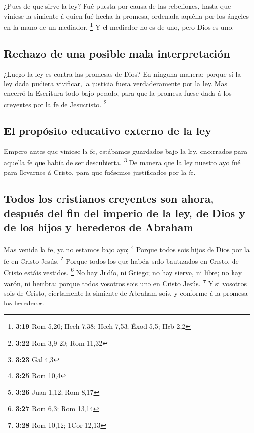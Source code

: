  ¿Pues de qué sirve la ley? Fué puesta por causa de las
rebeliones, hasta que viniese la simiente á quien fué hecha la promesa,
ordenada aquélla por los ángeles en la mano de un mediador. \footnote{\textbf{3:19}
  Rom 5,20; Hech 7,38; Hech 7,53; Éxod 5,5; Heb 2,2}  Y
el mediador no es de uno, pero Dios es uno.

\hypertarget{rechazo-de-una-posible-mala-interpretaciuxf3n}{%
\subsection{Rechazo de una posible mala
interpretación}\label{rechazo-de-una-posible-mala-interpretaciuxf3n}}

 ¿Luego la ley es contra las promesas de Dios? En ninguna
manera: porque si la ley dada pudiera vivificar, la justicia fuera
verdaderamente por la ley.  Mas encerró la Escritura todo
bajo pecado, para que la promesa fuese dada á los creyentes por la fe de
Jesucristo. \footnote{\textbf{3:22} Rom 3,9-20; Rom 11,32}

\hypertarget{el-propuxf3sito-educativo-externo-de-la-ley}{%
\subsection{El propósito educativo externo de la
ley}\label{el-propuxf3sito-educativo-externo-de-la-ley}}

 Empero antes que viniese la fe, estábamos guardados bajo
la ley, encerrados para aquella fe que había de ser descubierta.
\footnote{\textbf{3:23} Gal 4,3}  De manera que la ley
nuestro ayo fué para llevarnos á Cristo, para que fuésemos justificados
por la fe.

\hypertarget{todos-los-cristianos-creyentes-son-ahora-despuuxe9s-del-fin-del-imperio-de-la-ley-de-dios-y-de-los-hijos-y-herederos-de-abraham}{%
\subsection{Todos los cristianos creyentes son ahora, después del fin
del imperio de la ley, de Dios y de los hijos y herederos de
Abraham}\label{todos-los-cristianos-creyentes-son-ahora-despuuxe9s-del-fin-del-imperio-de-la-ley-de-dios-y-de-los-hijos-y-herederos-de-abraham}}

 Mas venida la fe, ya no estamos bajo ayo; \footnote{\textbf{3:25}
  Rom 10,4}  Porque todos sois hijos de Dios por la fe en
Cristo Jesús. \footnote{\textbf{3:26} Juan 1,12; Rom 8,17}
 Porque todos los que habéis sido bautizados en Cristo,
de Cristo estáis vestidos. \footnote{\textbf{3:27} Rom 6,3; Rom 13,14}
 No hay Judío, ni Griego; no hay siervo, ni libre; no hay
varón, ni hembra: porque todos vosotros sois uno en Cristo Jesús.
\footnote{\textbf{3:28} Rom 10,12; 1Cor 12,13}  Y si
vosotros sois de Cristo, ciertamente la simiente de Abraham sois, y
conforme á la promesa los herederos.

